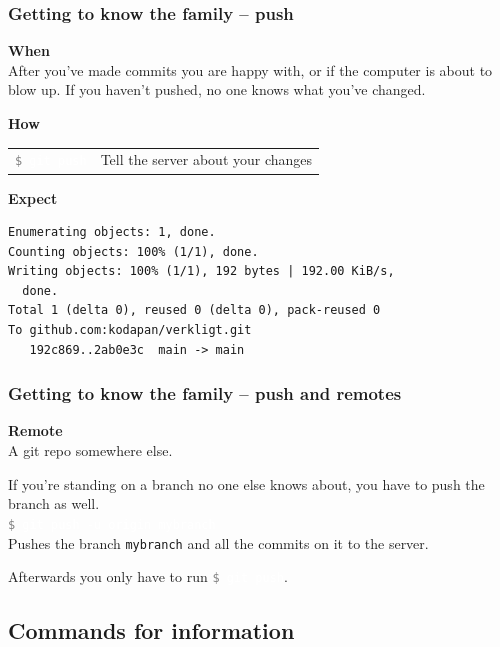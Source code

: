 \documentclass{beamer}
\newcommand{\keyword}[1]{\hspace{-1.0em}\textcolor{lkblue}{\textbf{#1}}\vspace{0.2em}} %
\newcommand{\command}[1]{\colorbox{black!78}{\vphantom{Ep}\texttt{\textcolor{gray}{\$}
\textcolor{white}{#1}}}}
\begin{document}
\begin{frame}[fragile]
  \frametitle{Getting to know the family -- push}
  \keyword{When}\\
    After you've made commits you are happy with, or if the computer
    is about to blow up. If you haven't pushed, no one knows what
    you've changed. \\
  \vspace{0.5em}

  \keyword{How}\\
  \hspace{-0.95em}
  \begin{tabular}{ll}
    \command{git push} & Tell the server about your changes \\
  \end{tabular}
  \vspace{0.5em}

  \keyword{Expect}\\ [0.1em]
\begin{verbatim}
Enumerating objects: 1, done.
Counting objects: 100% (1/1), done.
Writing objects: 100% (1/1), 192 bytes | 192.00 KiB/s,
  done.
Total 1 (delta 0), reused 0 (delta 0), pack-reused 0
To github.com:kodapan/verkligt.git
   192c869..2ab0e3c  main -> main
\end{verbatim}
\end{frame}

\begin{frame}[fragile]
  \frametitle{Getting to know the family -- push and remotes}
  \keyword{Remote}\\
  A git repo somewhere else. \\
  \vspace{1em}

  If you're standing on a branch no one else knows about, you have
  to push the branch as well. \\
  \vspace{1em}
  \command{git push -u origin mybranch} \\
  \vspace{1em}
  Pushes the branch \texttt{mybranch} and all the
  commits on it to the server.
  \vspace{1em}

  Afterwards you only have to run \command{git push}.

\end{frame}

\subsection{Commands for information}
\end{document}
